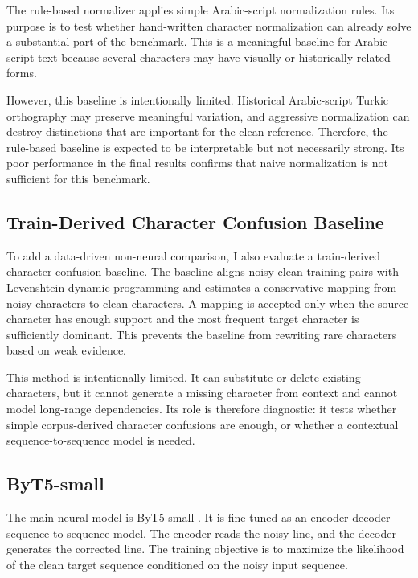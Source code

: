 \documentclass{article}
\begin{document}
The rule-based normalizer applies simple Arabic-script normalization rules. Its purpose is to test whether hand-written character normalization can already solve a substantial part of the benchmark. This is a meaningful baseline for Arabic-script text because several characters may have visually or historically related forms.

However, this baseline is intentionally limited. Historical Arabic-script Turkic orthography may preserve meaningful variation, and aggressive normalization can destroy distinctions that are important for the clean reference. Therefore, the rule-based baseline is expected to be interpretable but not necessarily strong. Its poor performance in the final results confirms that naive normalization is not sufficient for this benchmark.


\subsection{Train-Derived Character Confusion Baseline}

To add a data-driven non-neural comparison, I also evaluate a train-derived character confusion baseline. The baseline aligns noisy-clean training pairs with Levenshtein dynamic programming and estimates a conservative mapping from noisy characters to clean characters. A mapping is accepted only when the source character has enough support and the most frequent target character is sufficiently dominant. This prevents the baseline from rewriting rare characters based on weak evidence.

This method is intentionally limited. It can substitute or delete existing characters, but it cannot generate a missing character from context and cannot model long-range dependencies. Its role is therefore diagnostic: it tests whether simple corpus-derived character confusions are enough, or whether a contextual sequence-to-sequence model is needed.

\subsection{ByT5-small}

The main neural model is ByT5-small \cite{xue2022byt5}. It is fine-tuned as an encoder-decoder sequence-to-sequence model. The encoder reads the noisy line, and the decoder generates the corrected line. The training objective is to maximize the likelihood of the clean target sequence conditioned on the noisy input sequence.
\end{document}
